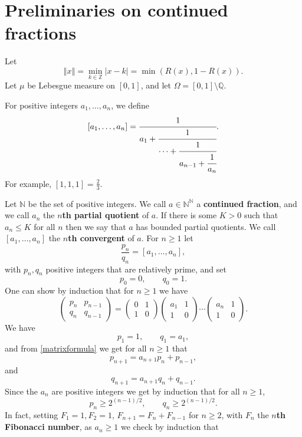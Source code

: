 \documentclass{article}
\newcommand{\norm}[1]{\left\Vert #1 \right\Vert}
\begin{document}
\section{Preliminaries on continued fractions}
\label{preliminaries}
Let 
\[
\norm{x}=\min_{k \in \mathbb{Z}} |x-k|=\min(R(x),1-R(x)).
\]
Let $\mu$ be Lebesgue measure on $[0,1]$, and let $\Omega=[0,1] \setminus \mathbb{Q}$.

For positive integers $a_1,\ldots,a_n$, we define
\[
[a_1,\ldots,a_n]=\cfrac{1}{a_1+\cfrac{1}{\cdots+\cfrac{1}{a_{n-1}+\cfrac{1}{a_n}}}}.
\]
For example, $[1,1,1]=\frac{2}{3}$.

Let $\mathbb{N}$ be the set of positive integers. We call $a \in \mathbb{N}^\mathbb{N}$ a \textbf{continued fraction}, and we call
$a_n$ the \textbf{$n$th partial quotient} of $a$. If there is some $K>0$ such that $a_n \leq K$ for all $n$ then we say that $a$ has bounded partial quotients.
We call
$[a_1,\ldots,a_n]$ the \textbf{$n$th convergent} of $a$. For $n \geq 1$ let
\[
\frac{p_n}{q_n}=[a_1,\ldots,a_n],
\]
with $p_n,q_n$ positive integers that are relatively prime, and set
\[
p_0=0,\qquad q_0=1.
\]
One can show by induction  \cite[p.~70, Lemma 3.1]{einsiedler} that for $n \geq 1$ we have
\begin{equation}
\begin{pmatrix}p_n&p_{n-1}\\q_n&q_{n-1}\end{pmatrix}=\begin{pmatrix}0&1\\1&0\end{pmatrix}\begin{pmatrix}a_1&1\\1&0\end{pmatrix}
\cdots \begin{pmatrix}a_n&1\\1&0\end{pmatrix}.
\label{matrixformula}
\end{equation}
We have
\[
p_1=1, \qquad q_1=a_1,
\]
 and from \eqref{matrixformula} we get for all $n \geq 1$ that
\[
p_{n+1}=a_{n+1}p_n+p_{n-1},
\]
and
\[
q_{n+1}=a_{n+1}q_n+q_{n-1}.
\]
Since the $a_n$ are positive integers we get by induction that for all $n \geq 1$,
\begin{equation}
p_n \geq 2^{(n-1)/2}, \qquad q_n \geq 2^{(n-1)/2}.
\label{qnbound}
\end{equation}
In fact, setting $F_1=1, F_2=1$, $F_{n+1}=F_n+F_{n-1}$ for $n \geq 2$, with $F_n$ the \textbf{$n$th
Fibonacci number},
as $a_n \geq 1$ we check by induction that
\end{document}
